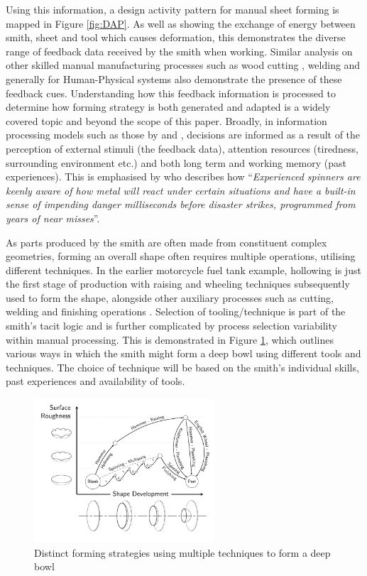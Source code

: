 Using this information, a design activity pattern for manual sheet forming is mapped in Figure \ref{fig:DAP}. As well as showing the exchange of energy between smith, sheet and tool which causes deformation, this demonstrates the diverse range of feedback data received by the smith when working. Similar analysis on other skilled manual manufacturing processes such as wood cutting \citep{Roth1981FoundationDesign}, welding \citep{Zhang2012ModelingPrinciples} and generally for Human-Physical systems \cite{Zhou2018TowardManufacturing} also demonstrate the presence of these feedback cues. Understanding how this feedback information is processed to determine how forming strategy is both generated and adapted is a widely covered topic and beyond the scope of this paper. Broadly, in information processing models such as those by \cite{Wickens2015EngineeringPerformance} and \cite{Endsley1995TowardSystems}, decisions are informed as a result of the perception of external stimuli (the feedback data), attention resources (tiredness, surrounding environment etc.) and both long term and working memory (past experiences). This is emphasised by \cite{Wiley2004TheHand-spinning} who describes how ``\textit{Experienced spinners are keenly aware of how metal will react under certain situations and have a built-in sense of impending danger milliseconds before disaster strikes, programmed from years of near misses}''.  

As parts produced by the smith are often made from constituent complex geometries, forming an overall shape often requires multiple operations, utilising different techniques. In the earlier motorcycle fuel tank example, hollowing is just the first stage of production with raising and wheeling techniques subsequently used to form the shape, alongside other auxiliary processes such as cutting, welding and finishing operations \citep{Barr2013ProfessionalFabrication}. Selection of tooling/technique is part of the smith's tacit logic and is further complicated by process selection variability within manual processing. This is demonstrated in Figure \ref{fig:ShapeDevBow}, which outlines various ways in which the smith might form a deep bowl using different tools and techniques. The choice of technique will be based on the smith’s individual skills, past experiences and availability of tools. 

\begin{figure}[h]
    \centering
    \includegraphics[width=0.6\textwidth]{Images/Bowlv2.pdf}
    \caption{Distinct forming strategies using multiple techniques to form a deep bowl}
    \label{fig:ShapeDevBow}
\end{figure}

